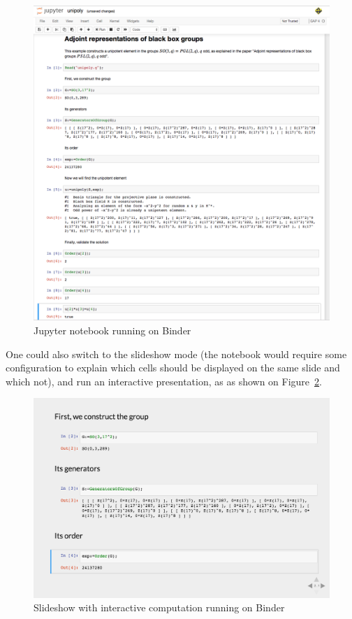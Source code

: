 \documentclass{deliverablereport}
\begin{document}
\begin{figure}[!ht]
    \centering
    \includegraphics[width=\textwidth]{images/unipoly-notebook}
    \caption{Jupyter notebook running on Binder}
    \label{fig:unipoly-notebook}
\end{figure}

One could also switch to the slideshow mode (the notebook would require
some configuration to explain which cells should be displayed on the
same slide and which not), and run an interactive presentation, as
as shown on Figure~\ref{fig:unipoly-slide}.

\begin{figure}[!ht]
    \centering
    \includegraphics[width=\textwidth]{images/unipoly-slide}
    \caption{Slideshow with interactive computation running on Binder}
    \label{fig:unipoly-slide}
\end{figure}
\end{document}
